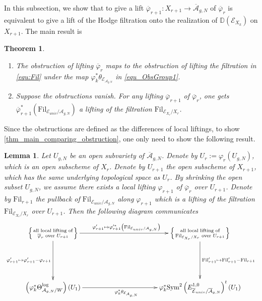 \documentclass[12pt,twoside]{book}
\theoremstyle{plain}
\newtheorem{theorem}{Theorem}[section]
\newtheorem{lemma}[lemma]{Lemma}
\theoremstyle{definition}
\theoremstyle{remark}
\numberwithin{equation}{section}
\begin{document}
In this subsection, we show that to give a lift $\overline{\varphi}_{r+1}\colon X_{r+1}\rightarrow {\overline{\mathcal A}_{g,N}}$ of $\overline{\varphi}_r$ is equivalent to give a lift of the Hodge filtration onto the realization of $\mathbb D(\mathcal E_{{X_k}})$ on $X_{r+1}$. The main result is
\begin{theorem}
\label{thm_main_comparing_obstruction}
\begin{enumerate}
\item The obstruction of lifting $\overline{\varphi}_r$ maps to the obstruction of lifting the filtration in \eqref{equ:Fil} under the map $\varphi_k^*\theta_{\mathcal E_{{\mathcal A_{g,N}}}}$ in \eqref{equ_ObsGroup1}.
\item Suppose the obstructions vanish. For any lifting $\overline{\varphi}_{r+1}$ of $\overline{\varphi}_r$, one gets $\overline{\varphi}_{r+1}^*(\mathrm{Fil}_{\mathcal E_{univ}/\mathcal A_{g,N}})$ a lifting of the filtration $\mathrm{Fil}_{\mathcal E_{X_r}/X_r}$.
\end{enumerate}
\end{theorem}

Since the obstructions are defined as the differences of local liftings, to show \autoref{thm_main_comparing_obstruction}, one only need to show the following result.
\begin{lemma} Let $U_{g,N}$ be an open subvariety of $\overline{\mathcal A}_{g,N}$. Denote by $U_r:=\varphi_r(U_{g,N})$, which is an open subscheme of $X_r$. Denote by $U_{r+1}$ the open subscheme of $X_{r+1}$, which has the same underlying topological space as $U_{r}$. By shrinking the open subset $U_{g,N}$, we assume there exists a local lifting $\varphi_{r+1}$ of $\overline{\varphi}_r$ over $U_{r+1}$. Denote by $\mathrm{Fil}_{r+1}$ the pullback of $\mathrm{Fil}_{\mathcal E_{univ}/\mathcal A_{g,N}}$ along $\varphi_{r+1}$ which is a lifting of the filtration $\mathrm{Fil}_{\mathcal E_{X_r}/X_r}$ over $U_{r+1}$. Then the following diagram communicates
\begin{equation*}
\xymatrix@R=2cm@C=4cm{
\left\{{\text{all local lifting of} \atop \text{$\overline{\varphi}_{r}$ over $U_{r+1}$}}\right\}
\ar[r]^{\varphi'_{r+1}\mapsto \varphi'^*_{r+1} \left(\mathrm{Fil}_{\mathcal E_{univ}/\mathcal A_{g,N}}\right)}
\ar[d]_{\varphi'_{r+1}\mapsto \varphi'_{r+1}-\varphi_{r+1}}
&
\left\{{\text{all local lifting of} \atop \text{$\mathrm{Fil}_{\mathcal E_{X_r}/X_r}$ over $U_{r+1}$}}\right\}
\ar[d]^{\mathrm{Fil}'_{r+1} \mapsto \mathrm{Fil}'_{r+1} - \mathrm{Fil}_{r+1}}
\\
\left(\varphi_k^* \Theta^{\log}_{{\mathcal A_{g,N}}/W}\right)(U_1)
\ar[r]_{\varphi_k^*\theta_{\mathcal E_{{\mathcal A_{g,N}}}}}
&
\varphi_k^* \mathrm{Sym}^2 \left(E^{1,0}_{\overline{\mathcal E}_{univ}/{\overline{\mathcal A}_{g,N}}}\right)^t(U_1)
\\
}
\end{equation*}
\end{lemma}
\end{document}
